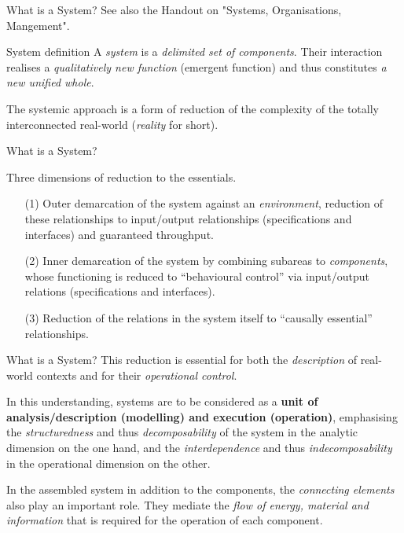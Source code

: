 \documentclass{beamer}
\title{Modelling Sustainable Systems\\ and Semantic Web\\[6pt]
  Systems and their Development
  \vskip1em}
\subtitle{Lecture in the Module 10-202-2312\\ for Master Computer Science}
\author{Prof. Dr. Hans-Gert Gräbe\\
\url{http://www.informatik.uni-leipzig.de/~graebe}}
\date{April 2022}
\begin{document}
{
\begin{frame}
  \titlepage
\end{frame}}

\begin{frame}{What is a System?}
See also the Handout on "Systems, Organisations, Mangement".

  \begin{block}{System definition}
    A \emph{system} is a \emph{delimited set of components}.  Their
    interaction realises a \emph{qualitatively new function} (emergent
    function) and thus constitutes \emph{a new unified whole}.
  \end{block}

The systemic approach is a form of reduction of the complexity of the totally
interconnected real-world (\emph{reality} for short).
\end{frame}

\begin{frame}{What is a System?}
  \begin{block}{Three dimensions of reduction to the essentials.}
    \begin{itemize}
    \item[(1)] Outer demarcation of the system against an \emph{environment},
      reduction of these relationships to input/output relationships
      (specifications and interfaces) and guaranteed throughput.
    \item[(2)] Inner demarcation of the system by combining subareas to
      \emph{components}, whose functioning is reduced to “behavioural control”
      via input/output relations (specifications and interfaces).
    \item[(3)] Reduction of the relations in the system itself to “causally
      essential” relationships.
    \end{itemize}
  \end{block}
\end{frame}

\begin{frame}{What is a System?}
This reduction is essential for both the \emph{description} of real-world
contexts and for their \emph{operational control}.

In this understanding, systems are to be considered as a \textbf{unit of
  analysis/description (modelling) and execution (operation)}, emphasising the
\emph{structuredness} and thus \emph{decomposability} of the system in the
analytic dimension on the one hand, and the \emph{interdependence} and thus
\emph{indecomposability} in the operational dimension on the other.

In the assembled system in addition to the components, the \emph{connecting
  elements} also play an important role.  They mediate the \emph{flow of
  energy, material and information} that is required for the operation of each
component.
\end{frame}
\end{document}
